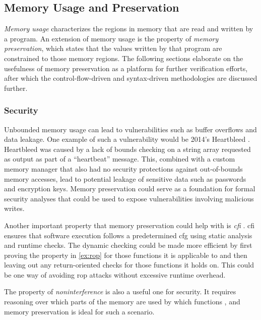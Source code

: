 \subsection{Memory Usage and Preservation}\label{memory_usage}
\emph{Memory usage} characterizes the regions in memory that are read and written by a program.
An extension of memory usage is the property of \emph{memory preservation},
which states that the values written by that program are constrained to those memory regions.
The following sections elaborate on the usefulness of memory preservation
as a platform for further verification efforts,
after which the control-flow-driven and syntax-driven methodologies are discussed further.

\subsubsection{Security}
Unbounded memory usage can lead to vulnerabilities
such as buffer overflows and data leakage.
One example of such a vulnerability would be 2014's Heartbleed \autocite{heartbleed}.
Heartbleed was caused by a lack of bounds checking on a string array
requested as output as part of a ``heartbeat'' message.
This, combined with a custom memory manager
that also had no security protections against out-of-bounds memory accesses,
lead to potential leakage of sensitive data such as passwords and encryption keys.
Memory preservation could serve as a foundation for formal security analyses
that could be used to expose vulnerabilities involving malicious writes.

Another important property that memory preservation could help with
is \emph{\ac{cfi}} \autocite{abadi2009cfi}. \Ac{cfi} ensures that software execution
follows a predetermined \ac{cfg} using static analysis and runtime checks.
The dynamic checking could be made more efficient
by first proving the property in \cref{ex:rop} for those functions it is applicable to
and then leaving out any return-oriented checks for those functions it holds on.
This could be one way of avoiding \ac{rop} attacks without excessive runtime overhead.

The property of \emph{noninterference} is also a useful one for security.
It requires reasoning over which parts of the memory are used by which functions \autocite{rushby1992noninterference},
and memory preservation is ideal for such a scenario.

